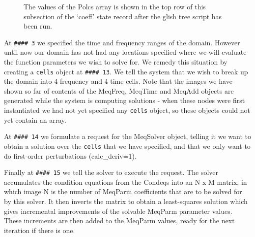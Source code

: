 \documentclass[10pt]{article}
\begin{document}
\begin{figure}
{\par\centering
{}
\par}
\caption {The values of the Polcs array is shown in the top row of
this subsection of the `coeff' state record after the glish tree script
has been run.}
\label{fig:coeff_polcs}
\end{figure}


At {\tt \#\#\#\# 3} we specified the time and frequency ranges of the
domain. However until now our domain has not had any locations specified
where we will evaluate the function parameters we wish to solve for. We
remedy this situation by creating a {\tt cells} object at {\tt \#\#\#\# 13}.
We tell the system that we wish to break up the domain into 
4 frequency and 4 time cells. Note that the images we have shown so far
of contents of the MeqFreq, MeqTime and MeqAdd objects are generated while
the system is computing solutions - when these nodes were first 
instantiated we had not yet specified any {\tt cells} object, so these
objects could not yet contain an array.


At {\tt \#\#\#\# 14} we formulate a request for the MeqSolver object,
telling it we want to obtain a solution over the {\tt cells} that
we have specified, and that we only want to do first-order
perturbations (calc\_deriv=1).

Finally at {\tt \#\#\#\# 15} we tell the solver to execute the
request. 
The solver accumulates the condition equations from the Condeqs into
an N x M matrix, in which image N is the number of MeqParm coefficients
that are to be solved for by this solver. It then inverts the matrix
to obtain a least-squares solution which gives incremental improvements of
the solvable MeqParm parameter values. These increments are then added to the
MeqParm values, ready for the next iteration if there is one.
\end{document}
